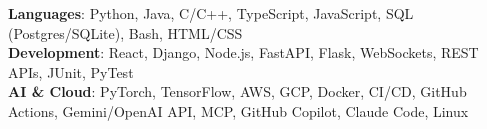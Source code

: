 \begin{itemize}[leftmargin=0.15in, label={}]
    \small{\item{
     \textbf{Languages}{: Python, Java, C/C++, TypeScript, JavaScript, SQL (Postgres/SQLite), Bash, HTML/CSS} \\
     \textbf{Development}{: React, Django, Node.js, FastAPI, Flask, WebSockets, REST APIs, JUnit, PyTest} \\
     \textbf{AI \& Cloud}{: PyTorch, TensorFlow, AWS, GCP, Docker, CI/CD, GitHub Actions, Gemini/OpenAI API, MCP, GitHub Copilot, Claude Code, Linux}
    }}
\end{itemize}
